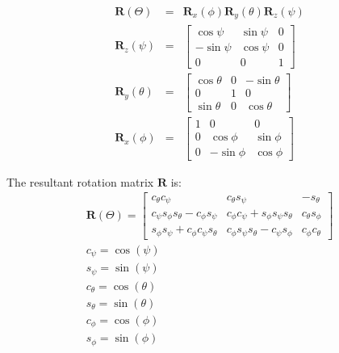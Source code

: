 \documentclass[a4paper,12pt]{article}
\begin{document}
\begin{equation}
    \begin{aligned}
        \mathbf{R}(\Theta) &=& \mathbf{R}_x(\phi)  \mathbf{R}_y(\theta) \mathbf{R}_z(\psi)\\
        \mathbf{R}_z(\psi) &=& \begin{bmatrix}
                                 \cos\psi & \sin\psi & 0 \\
                                 -\sin\psi & \cos\psi  & 0 \\
                                 0        & 0         & 1
                             \end{bmatrix}                                               \\
        \mathbf{R}_y(\theta) &=& \begin{bmatrix}
                                   \cos\theta  & 0 & -\sin\theta \\
                                   0           & 1 & 0          \\
                                   \sin\theta & 0 & \cos\theta
                               \end{bmatrix}                                         \\
        \mathbf{R}_x(\phi) &=& \begin{bmatrix}
                                 1 & 0        & 0         \\
                                 0 & \cos\phi & \sin\phi \\
                                 0 & -\sin\phi & \cos\phi
                             \end{bmatrix}
    \end{aligned}
\end{equation}

The resultant rotation matrix \( \mathbf{R} \) is:
\begin{equation}
    \begin{aligned}
        \mathbf{R}(\Theta) =
        \begin{bmatrix}
            c_\theta c_\psi & c_\theta s_\psi & -s_\theta \\
            c_\psi s_\phi s_\theta - c_\phi s_\psi & c_\phi c_\psi + s_\phi s_\psi s_\theta & c_\theta s_\phi \\
            s_\phi s_\psi + c_\phi c_\psi s_\theta & c_\phi s_\psi s_\theta - c_\psi s_\phi & c_\phi c_\theta
\end{bmatrix} \\
        c_\psi = \cos(\psi)\\
        s_\psi = \sin(\psi)\\
        c_\theta = \cos(\theta)\\
        s_\theta = \sin(\theta)\\
        c_\phi = \cos(\phi)\\
        s_\phi = \sin(\phi)\\
    \end{aligned}
\end{equation}
\end{document}
